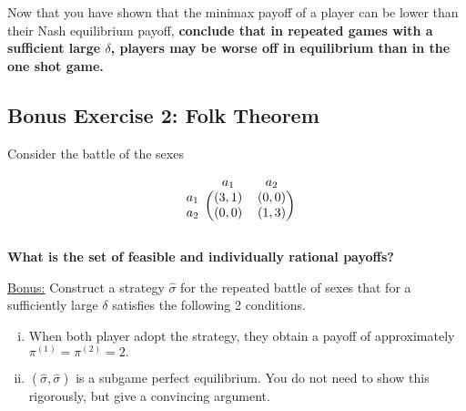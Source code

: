 \documentclass[10pt]{article}
\begin{document}
Now that you have shown that the minimax payoff of a player can be lower than
their Nash equilibrium payoff, \textbf{conclude that in repeated games with a
sufficient large \(\delta\), players may be worse off in equilibrium than in the
one shot game.}

\subsection*{Bonus Exercise 2: Folk Theorem}

Consider the battle of the sexes

\begin{equation*}
    \begin{blockarray}{ccc}
        & a_1 & a_2 \\
        \begin{block}{c(cc)}
            a_1 & (3, 1) & (0, 0) \\
            a_2 & (0, 0) & (1, 3) \\
        \end{block}
    \end{blockarray}
\end{equation*}

\textbf{What is the set of feasible and individually rational payoffs?}

\underline{Bonus:} Construct a strategy \(\hat{\sigma}\) for the repeated battle of sexes
that for a sufficiently large \(\delta\) satisfies the following 2 conditions.

\begin{enumerate}[(i)]
    \item When both player adopt the strategy, they obtain a payoff of approximately
    \(\pi^{(1)} = \pi^{(2)} = 2.\)
    \item \((\hat{\sigma}, \hat{\sigma})\) is a subgame perfect equilibrium.
    You do not need to show this rigorously, but give a convincing argument.
\end{enumerate}
\end{document}
